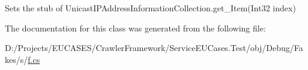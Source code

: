 Sets the stub of Unicast\-I\-P\-Address\-Information\-Collection.\-get\-\_\-\-Item(\-Int32 index)



The documentation for this class was generated from the following file\-:\begin{DoxyCompactItemize}
\item 
D\-:/\-Projects/\-E\-U\-C\-A\-S\-E\-S/\-Crawler\-Framework/\-Service\-E\-U\-Cases.\-Test/obj/\-Debug/\-Fakes/s/\hyperlink{s_2f_8cs}{f.\-cs}\end{DoxyCompactItemize}
